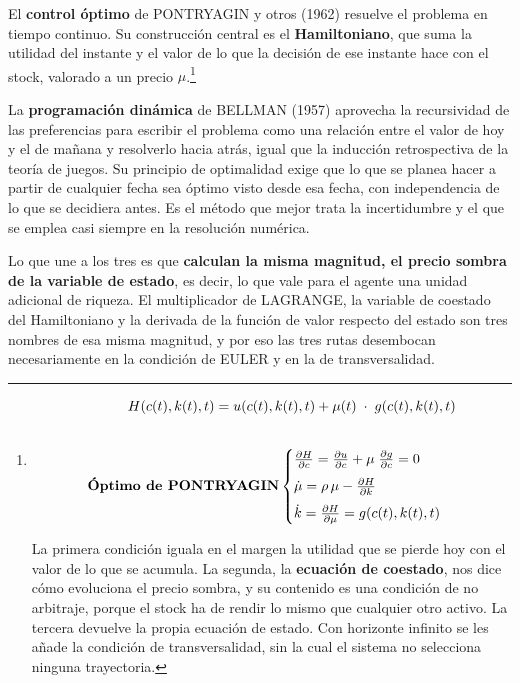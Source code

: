 \documentclass[10pt,a4paper]{article}
\begin{document}
El \textbf{control óptimo} de PONTRYAGIN y otros (1962) resuelve el problema en tiempo continuo. Su construcción central es el \textbf{Hamiltoniano}, que suma la utilidad del instante y el valor de lo que la decisión de ese instante hace con el stock, valorado a un precio $\mu$.\footnote{%
    $$\begin{aligned}
    H(c(t), k(t), t)=u(c(t), k(t), t)+\mu(t)\;\cdot \;g(c(t), k(t), t)\\[2em]
    \text{\textbf{Óptimo de PONTRYAGIN}}
    \begin{cases}
        \frac{\partial H}{\partial c}=\frac{\partial u}{\partial c}+\mu\;\frac{\partial g}{\partial c}=0\\[0.5em]
        \dot\mu=\rho\,\mu-\frac{\partial H}{\partial k}\\[0.5em]
        \dot k=\frac{\partial H}{\partial \mu}=g(c(t), k(t), t)
    \end{cases}
\end{aligned}$$

La primera condición iguala en el margen la utilidad que se pierde hoy con el valor de lo que se acumula. La segunda, la \textbf{ecuación de coestado}, nos dice cómo evoluciona el precio sombra, y su contenido es una condición de no arbitraje, porque el stock ha de rendir lo mismo que cualquier otro activo. La tercera devuelve la propia ecuación de estado. Con horizonte infinito se les añade la condición de transversalidad, sin la cual el sistema no selecciona ninguna trayectoria.
}

La \textbf{programación dinámica} de BELLMAN (1957) aprovecha la recursividad de las preferencias para escribir el problema como una relación entre el valor de hoy y el de mañana y resolverlo hacia atrás, igual que la inducción retrospectiva de la teoría de juegos. Su principio de optimalidad exige que lo que se planea hacer a partir de cualquier fecha sea óptimo visto desde esa fecha, con independencia de lo que se decidiera antes. Es el método que mejor trata la incertidumbre y el que se emplea casi siempre en la resolución numérica.

Lo que une a los tres es que \textbf{calculan la misma magnitud, el precio sombra de la variable de estado}, es decir, lo que vale para el agente una unidad adicional de riqueza. El multiplicador de LAGRANGE, la variable de coestado del Hamiltoniano y la derivada de la función de valor respecto del estado son tres nombres de esa misma magnitud, y por eso las tres rutas desembocan necesariamente en la condición de EULER y en la de transversalidad.
\end{document}
